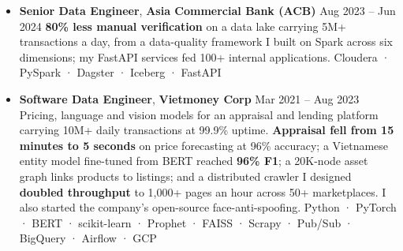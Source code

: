 \documentclass[10pt,a4paper,ragged2e,withhyper]{altacv}
\newcommand{\pastjob}[3]{\textbf{#1}, \textbf{\textcolor{accent}{#2}} \textcolor{accent}{\textbullet} #3\newline}
\newcommand{\win}[1]{\textbf{\textcolor{emphasis}{#1}}}
\begin{document}

\begin{itemize}[leftmargin=*,itemsep=5pt,topsep=1pt,parsep=0pt]
  \item \pastjob{Senior Data Engineer}{Asia Commercial Bank (ACB)}{Aug 2023 -- Jun 2024}
  \win{80\% less manual verification} on a data lake carrying 5M+ transactions a day, from a data-quality framework I built on Spark across six dimensions; my FastAPI services fed 100+ internal applications. {\scriptsize\textcolor{emphasis}{Cloudera · PySpark · Dagster · Iceberg · FastAPI}}

  \item \pastjob{Software Data Engineer}{Vietmoney Corp}{Mar 2021 -- Aug 2023}
  Pricing, language and vision models for an appraisal and lending platform carrying 10M+ daily transactions at 99.9\% uptime. \win{Appraisal fell from 15 minutes to 5 seconds} on price forecasting at 96\% accuracy; a Vietnamese entity model fine-tuned from BERT reached \win{96\% F1}; a 20K-node asset graph links products to listings; and a distributed crawler I designed \win{doubled throughput} to 1,000+ pages an hour across 50+ marketplaces. I also started the company's open-source face-anti-spoofing. {\scriptsize\textcolor{emphasis}{Python · PyTorch · BERT · scikit-learn · Prophet · FAISS · Scrapy · Pub/Sub · BigQuery · Airflow · GCP}}


\end{itemize}
\end{document}
